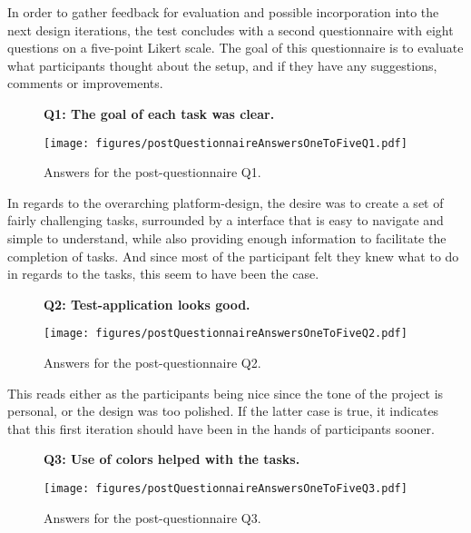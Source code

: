     In order to gather feedback for evaluation and possible incorporation
    into the next design iterations, the test concludes with a second
    questionnaire with eight questions on a five-point Likert scale. The goal
    of this questionnaire is to evaluate what participants thought about the setup,
    and if they have any suggestions, comments or improvements.

    \begin{figure}[h!]
      \textbf{Q1: The goal of each task was clear.}
      \begin{center}
        \texttt{[image: figures/postQuestionnaireAnswersOneToFiveQ1.pdf]}
        \caption{Answers for the post-questionnaire Q1.}
      \end{center}
    \end{figure}

    In regards to the overarching platform-design, the desire was to create
    a set of fairly challenging tasks, surrounded by a interface that is easy to
    navigate and simple to understand, while also providing enough information
    to facilitate the completion of tasks. And since most of the participant felt
    they knew what to do in regards to the tasks, this seem to have been the
    case.

    \begin{figure}[h!]
      \textbf{Q2: Test-application looks good.}
      \begin{center}
        \texttt{[image: figures/postQuestionnaireAnswersOneToFiveQ2.pdf]}
        \caption{Answers for the post-questionnaire Q2.}
      \end{center}
    \end{figure}

    This reads either as the participants being nice since the tone of the
    project is personal, or the design was too polished. If the latter case
    is true, it indicates that this first iteration should have been in the
    hands of participants sooner.

    \begin{figure}[h!]
      \textbf{Q3: Use of colors helped with the tasks.}
      \begin{center}
        \texttt{[image: figures/postQuestionnaireAnswersOneToFiveQ3.pdf]}
        \caption{Answers for the post-questionnaire Q3.}
      \end{center}
    \end{figure}

